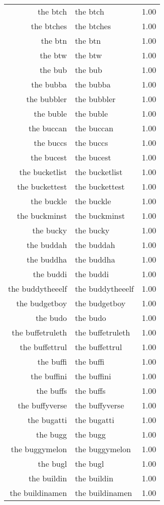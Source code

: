 \begin{table}[ht]
\begin{tabular}{rlr}
  the btch & the btch & 1.00 \\ 
  the btches & the btches & 1.00 \\ 
  the btn & the btn & 1.00 \\ 
  the btw & the btw & 1.00 \\ 
  the bub & the bub & 1.00 \\ 
  the bubba & the bubba & 1.00 \\ 
  the bubbler & the bubbler & 1.00 \\ 
  the buble & the buble & 1.00 \\ 
  the buccan & the buccan & 1.00 \\ 
  the buccs & the buccs & 1.00 \\ 
  the bucest & the bucest & 1.00 \\ 
  the bucketlist & the bucketlist & 1.00 \\ 
  the buckettest & the buckettest & 1.00 \\ 
  the buckle & the buckle & 1.00 \\ 
  the buckminst & the buckminst & 1.00 \\ 
  the bucky & the bucky & 1.00 \\ 
  the buddah & the buddah & 1.00 \\ 
  the buddha & the buddha & 1.00 \\ 
  the buddi & the buddi & 1.00 \\ 
  the buddytheeelf & the buddytheeelf & 1.00 \\ 
  the budgetboy & the budgetboy & 1.00 \\ 
  the budo & the budo & 1.00 \\ 
  the buffetruleth & the buffetruleth & 1.00 \\ 
  the buffettrul & the buffettrul & 1.00 \\ 
  the buffi & the buffi & 1.00 \\ 
  the buffini & the buffini & 1.00 \\ 
  the buffs & the buffs & 1.00 \\ 
  the buffyverse & the buffyverse & 1.00 \\ 
  the bugatti & the bugatti & 1.00 \\ 
  the bugg & the bugg & 1.00 \\ 
  the buggymelon & the buggymelon & 1.00 \\ 
  the bugl & the bugl & 1.00 \\ 
  the buildin & the buildin & 1.00 \\ 
  the buildinamen & the buildinamen & 1.00 \\ 

\end{tabular}
\end{table}
